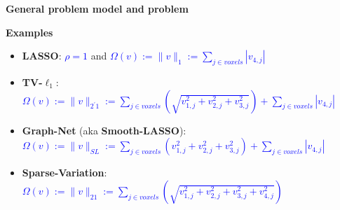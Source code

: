 \documentclass[french]{STIC_poster}
\begin{document}
\begin{frame}[t]
\begin{columns}[t]
\begin{column}{.48\linewidth}
\begin{sxbox}[\textwidth]{\textbf{General problem model and problem}}
\begin{itemize}
\begin{itemize}
                                    \end{itemize}
                                  \begin{nbox}{\textbf{Examples}}
                                  \begin{itemize}
                                  \item \textbf{LASSO}: \textcolor{blue}{$\rho=1$} and \textcolor{blue}{$\Omega(v):=\|v\|_1:= \sum_{j\in voxels}{|v_{4,j}|}$}
                                  \item \textbf{TV-$\ell_1$}:
                                    \textcolor{blue}{$\Omega(v):=\|v\|_{2^{'}1}:=\sum_{j \in voxels}{\left(\sqrt{v_{1,j}^2 + v_{2,j}^2 + v_{3,j}^2}\right)} + \sum_{j \in voxels}{|v_{4,j}|}$}
                                  \item \textbf{Graph-Net} (aka \textbf{Smooth-LASSO}):\\
                                    \textcolor{blue}{$\Omega(v):=\|v\|_{SL}:=\sum_{j \in voxels}{\left(v_{1,j}^2 + v_{2,j}^2 + v_{3,j}^2\right)} + \sum_{j \in voxels}{|v_{4,j}|}$}
                                  \item \textbf{Sparse-Variation}:
                                    \textcolor{blue}{$\Omega(v):=\|v\|_{21}:=\sum_{j \in voxels}{\left(\sqrt{v_{1,j}^2 + v_{2,j}^2 + v_{3,j}^2 + v_{4,j}^2}\right)}$}
                                  \end{itemize}
                                  \end{nbox}
                                  \end{itemize}


\end{sxbox}
\end{column}
\end{columns}
\end{frame}
\end{document}
